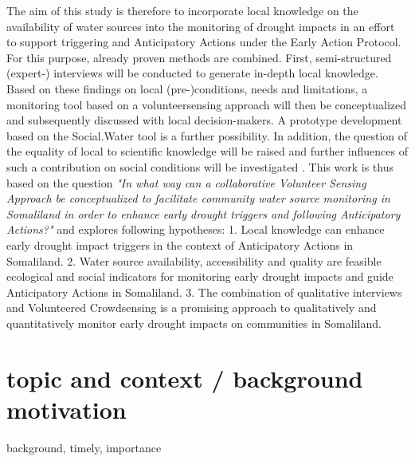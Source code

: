 The aim of this study is therefore to incorporate local knowledge on the availability of water sources into the monitoring of drought impacts in an effort to support triggering and Anticipatory Actions under the Early Action Protocol. For this purpose, already proven methods are combined. First, semi-structured (expert-) interviews will be conducted to generate in-depth local knowledge. Based on these findings on local (pre-)conditions, needs and limitations, a monitoring tool based on a volunteersensing approach will then be conceptualized and subsequently discussed with local decision-makers. A prototype development based on the Social.Water tool is a further possibility. In addition, the question of the equality of local to scientific knowledge will be raised and further influences of such a contribution on social conditions will be investigated .
This work is thus based on the question \textit{"In what way can a collaborative Volunteer Sensing Approach be conceptualized to facilitate community water source monitoring in Somaliland in order to enhance early drought triggers and following Anticipatory Actions?"} and explores following hypotheses:
1. Local knowledge can enhance early drought impact triggers in the context of Anticipatory Actions in Somaliland.
2. Water source availability, accessibility and quality are feasible ecological and social indicators for monitoring early drought impacts and guide Anticipatory Actions in Somaliland.
3. The combination of qualitative interviews and Volunteered Crowdsensing is a promising approach to qualitatively and quantitatively monitor early drought impacts on communities in Somaliland.


\section{topic and context / background motivation}
background, timely, importance


